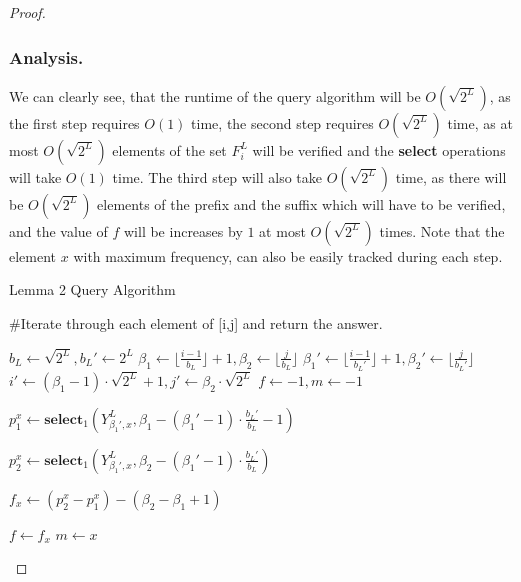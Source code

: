 \documentclass[runningheads]{llncs}
\begin{document}
\begin{proof}
        \subsubsection{Analysis.}
        We can clearly see, that the runtime of the query algorithm will be $O(\sqrt{2^L})$, as the first step requires $O(1)$ time, 
        the second step requires $O(\sqrt{2^L})$ time, as at most $O(\sqrt{2^L})$ elements of the set $F_i^L$ will be verified and the \textbf{select} operations will take $O(1)$ time.
        The third step will also take $O(\sqrt{2^L})$ time, as there will be $O(\sqrt{2^L})$ elements of the prefix and the suffix which will have to be verified, and the value of $f$ 
        will be increases by $1$ at most $O(\sqrt{2^L})$ times. Note that the element $x$ with maximum frequency, can also be easily tracked during each step.   



        \begin{algorithm}[H]
            \caption{Lemma 2 Query Algorithm}\label{lemma2Query}
            \begin{algorithmic}[1]
            

            \State \#Iterate through each element of [i,j] and return the answer.
            
            \EndIf
            \State $b_L \gets \sqrt{2^L}, b_L' \gets 2^L$
            \State $\beta_1 \gets \lfloor \frac{i-1}{ b_L } \rfloor +1, \beta_2 \gets \lfloor \frac{j}{b_L} \rfloor$
            \State $\beta_1' \gets \lfloor \frac{i-1}{ b_L' } \rfloor +1, \beta_2' \gets \lfloor \frac{j}{b_L'} \rfloor$
            \State $i' \gets (\beta_1-1) \cdot \sqrt{2^L} + 1 , j' \gets \beta_2 \cdot \sqrt{2^L} $
            \State $f \gets -1 , m\gets -1$
            
                \State $p_1^x \gets \textbf{select}_1( Y_{\beta_1',x}^L, \beta_1-(\beta_1'-1)\cdot \frac{b_L'}{b_L}-1 )$
            
                \State $ p_2^x \gets \textbf{select}_1( Y_{\beta_1',x}^L, \beta_2-(\beta_1'-1)\cdot \frac{b_L'}{b_L} ) $
                
                \State $f_x\gets (p^x_2-p^x_1)-(\beta_2-\beta_1+1)$
                
                \State $f\gets f_x$
                \State $m\gets x$
                \EndIf
                \EndFor
            

\end{algorithmic}
\end{algorithm}
\end{proof}
\end{document}
